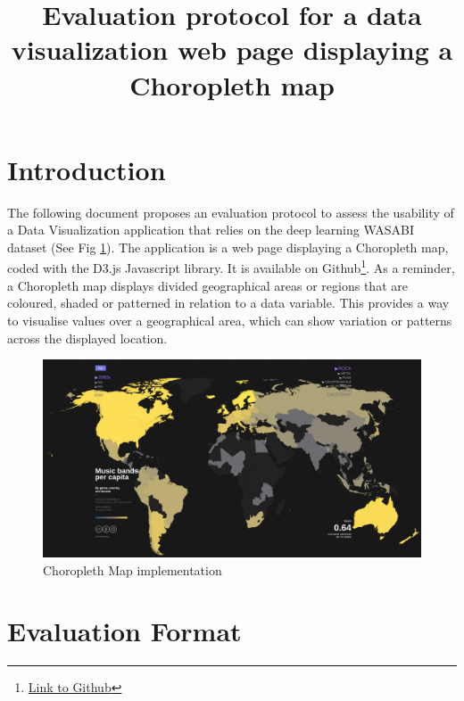 \documentclass[twocolumn, letterpaper,13pt]{scrartcl}
\begin{document}
    \title{\color{seablue}Evaluation protocol for a data visualization web page displaying a Choropleth map}

	\maketitle
	
    \section*{Introduction}
    
    The following document proposes an evaluation protocol to assess the usability of a Data Visualization application that relies on the deep learning WASABI dataset (See Fig \ref{fig:a}).
    \newline\newline
    The application is a web page displaying a Choropleth map, coded with the D3.js Javascript library. It is available on Github\footnote{\href{https://github.com/LMquentinLR/choropleth\_wasabi\_dataset}{Link to Github}}.
    \newline\newline
    As a reminder, a Choropleth map displays divided geographical areas or regions that are coloured, shaded or patterned in relation to a data variable. This provides a way to visualise values over a geographical area, which can show variation or patterns across the displayed location.
    
    \begin{figure}	\includegraphics[width=0.98\linewidth]{map.png}
    \caption{Choropleth Map implementation\label{fig:a}}
    \end{figure}
    
    \section*{Evaluation Format}
\end{document}
